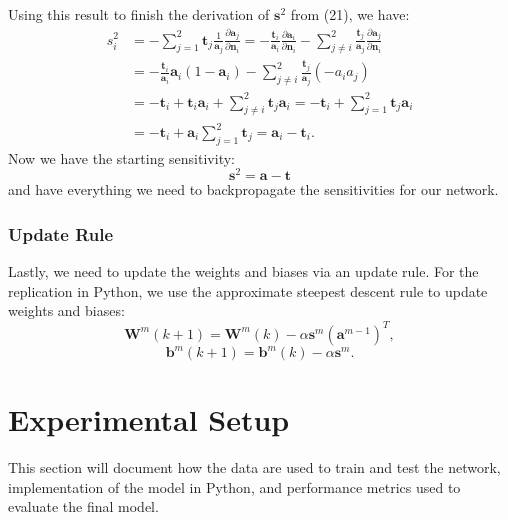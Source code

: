 \documentclass[12pt,halfline,a4paper]{ouparticle}
\begin{document}
Using this result to finish the derivation of $\mathbf{s}^{2}$ from (21), we have: 
\begin{equation}
\begin{split}
s_{i}^{2} &= - \sum_{j = 1}^{2} \mathbf{t}_{j} \frac{1}{\mathbf{a}_{j}} \frac{\partial \mathbf{a}_{j}}{\partial \mathbf{n}_{i}} = - \frac{\mathbf{t}_{i}}{\mathbf{a}_{i}} \frac{\partial \mathbf{a}_{i}}{\partial \mathbf{n}_{i}} - \sum_{j \neq i}^{2} \frac{\mathbf{t}_{j}}{\mathbf{a}_{j}} \frac{\partial \mathbf{a}_{j}}{\partial \mathbf{n}_{i}} \\
& = - \frac{\mathbf{t}_{i}}{\mathbf{a}_{i}} \mathbf{a}_{i}(1 - \mathbf{a}_{i}) - \sum_{j \neq i}^{2} \frac{\mathbf{t}_{j}}{\mathbf{a}_{j}}(-a_{i}a_{j}) \\
& = - \mathbf{t}_{i} + \mathbf{t}_{i}\mathbf{a}_{i} + \sum_{j \neq i}^{2} \mathbf{t}_{j}\mathbf{a}_{i} = - \mathbf{t}_{i} + \sum_{j = 1}^{2} \mathbf{t}_{j}\mathbf{a}_{i} \\
& = - \mathbf{t}_{i} + \mathbf{a}_{i} \sum_{j = 1}^{2} \mathbf{t}_{j} = \mathbf{a}_{i}  - \mathbf{t}_{i}.
\end{split}
\end{equation}
Now we have the starting sensitivity: 
\begin{equation}
\mathbf{s}^{2} = \mathbf{a} - \mathbf{t}
\end{equation}
and have everything we need to backpropagate the sensitivities for our network. 

\subsubsection{Update Rule}
\label{sec4.2.4}
Lastly, we need to update the weights and biases via an update rule. For the replication in Python, we use the approximate steepest descent rule to update weights and biases: 
\begin{equation}
\mathbf{W}^{m}(k+1) = \mathbf{W}^{m}(k) - \alpha \mathbf{s}^{m}(\mathbf{a}^{m-1})^{T}, 
\end{equation}
\begin{equation}
\mathbf{b}^{m}(k+1) = \mathbf{b}^{m}(k) - \alpha \mathbf{s}^{m}. 
\end{equation}

\section{Experimental Setup}
\label{sec5}
This section will document how the data are used to train and test the network, implementation of the model in Python, and performance metrics used to evaluate the final model. 
\end{document}
